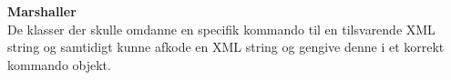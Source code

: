 \textbf{Marshaller}\\
De klasser der skulle omdanne en specifik kommando til en tilsvarende XML string og samtidigt kunne afkode en XML string og gengive denne i et korrekt kommando objekt.\\
